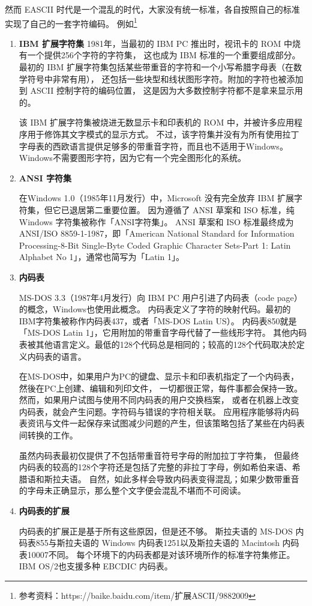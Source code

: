 然而 EASCII 时代是一个混乱的时代，大家没有统一标准，各自按照自己的标准实现了自己的一套字符编码。
例如\footnote{参考资料：https://baike.baidu.com/item/扩展ASCII/9882009}
\begin{enumerate}
  \item \textbf{IBM 扩展字符集}
      1981年，当最初的 IBM PC 推出时，视讯卡的 ROM 中烧有一个提供256个字符的字符集，
      这也成为 IBM 标准的一个重要组成部分。
      最初的 IBM 扩展字符集包括某些带重音的字符和一个小写希腊字母表（在数学符号中非常有用），
      还包括一些块型和线状图形字符。附加的字符也被添加到 ASCII 控制字符的编码位置，
      这是因为大多数控制字符都不是拿来显示用的。

      该 IBM 扩展字符集被烧进无数显示卡和印表机的 ROM 中，并被许多应用程序用于修饰其文字模式的显示方式。
      不过，该字符集并没有为所有使用拉丁字母表的西欧语言提供足够多的带重音字符，而且也不适用于Windows。
      Windows不需要图形字符，因为它有一个完全图形化的系统。

  \item \textbf{ANSI 字符集}

      在Windows 1.0（1985年11月发行）中，Microsoft 没有完全放弃 IBM 扩展字符集，但它已退居第二重要位置。
      因为遵循了 ANSI 草案和 ISO 标准，纯 Windows 字符集被称作「ANSI字符集」。
      ANSI 草案和 ISO 标准最终成为 ANSI/ISO 8859-1-1987，即「American National Standard for
      Information Processing-8-Bit Single-Byte Coded Graphic Character
      Sets-Part 1: Latin Alphabet No 1」，通常也简写为「Latin 1」。

  \item \textbf{内码表}

      MS-DOS 3.3（1987年4月发行）向 IBM PC 用户引进了内码表（code page）的概念，Windows也使用此概念。
      内码表定义了字符的映射代码。最初的IBM字符集被称作内码表437，或者「MS-DOS Latin US）。
      内码表850就是「MS-DOS Latin 1」，它用附加的带重音字母代替了一些线形字符。
      其他内码表被其他语言定义。最低的128个代码总是相同的；较高的128个代码取决於定义内码表的语言。

      在MS-DOS中，如果用户为PC的键盘、显示卡和印表机指定了一个内码表，然後在PC上创建、编辑和列印文件，
      一切都很正常，每件事都会保持一致。然而，如果用户试图与使用不同内码表的用户交换档案，
      或者在机器上改变内码表，就会产生问题。字符码与错误的字符相关联。
      应用程序能够将内码表资讯与文件一起保存来试图减少问题的产生，但该策略包括了某些在内码表间转换的工作。

      虽然内码表最初仅提供了不包括带重音符号字母的附加拉丁字符集，
      但最终内码表的较高的128个字符还是包括了完整的非拉丁字母，例如希伯来语、希腊语和斯拉夫语。
      自然，如此多样会导致内码表变得混乱；如果少数带重音的字母未正确显示，那么整个文字便会混乱不堪而不可阅读。

  \item \textbf{内码表的扩展}

      内码表的扩展正是基于所有这些原因，但是还不够。
      斯拉夫语的 MS-DOS 内码表855与斯拉夫语的 Windows 内码表1251以及斯拉夫语的 Macintosh 内码表10007不同。
      每个环境下的内码表都是对该环境所作的标准字符集修正。
      IBM OS/2也支援多种 EBCDIC 内码表。
\end{enumerate}

